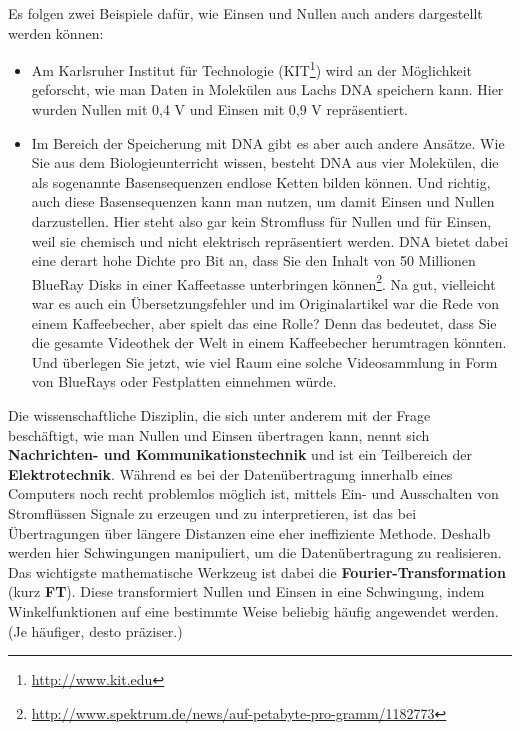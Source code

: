 Es folgen zwei Beispiele dafür, wie Einsen und Nullen auch anders dargestellt werden können:
\begin{itemize}
	\item Am Karlsruher Institut für Technologie (KIT\footnote{\url{http://www.kit.edu}}) wird an der Möglichkeit geforscht, wie man Daten in Molekülen aus Lachs DNA speichern kann. Hier wurden Nullen mit 0,4 V und Einsen mit 0,9 V repräsentiert.
	
	\item Im Bereich der Speicherung mit DNA gibt es aber auch andere Ansätze. Wie Sie aus dem Biologieunterricht wissen, besteht DNA aus vier Molekülen, die als sogenannte Basensequenzen endlose Ketten bilden können. Und richtig, auch diese Basensequenzen kann man nutzen, um damit Einsen und Nullen darzustellen. Hier steht also gar kein Stromfluss für Nullen und für Einsen, weil sie chemisch und nicht elektrisch repräsentiert werden. DNA bietet dabei eine derart hohe Dichte pro Bit an, dass Sie den Inhalt von 50 Millionen BlueRay Disks in einer Kaffeetasse unterbringen können\footnote{\url{http://www.spektrum.de/news/auf-petabyte-pro-gramm/1182773}}. Na gut, vielleicht war es auch ein Übersetzungsfehler und im Originalartikel war die Rede von einem Kaffeebecher, aber spielt das eine Rolle? Denn das bedeutet, dass Sie die gesamte Videothek der Welt in einem Kaffeebecher herumtragen könnten. Und überlegen Sie jetzt, wie viel Raum eine solche Videosammlung in Form von BlueRays oder Festplatten einnehmen würde.
\end{itemize}

Die wissenschaftliche Disziplin, die sich unter anderem mit der Frage \\beschäftigt, wie man Nullen und Einsen übertragen kann, nennt sich\\ \textbf{Nachrichten- und Kommunikationstechnik} und ist ein Teilbereich der\\ \textbf{Elektrotechnik}. Während es bei der Datenübertragung innerhalb eines \\ Computers noch recht problemlos möglich ist, mittels Ein- und Ausschalten von Stromflüssen Signale zu erzeugen und zu interpretieren, ist das bei Übertragungen über längere Distanzen eine eher ineffiziente Methode. Deshalb werden hier Schwingungen manipuliert, um die Datenübertragung zu realisieren. Das wichtigste mathematische Werkzeug ist dabei die \textbf{Fourier-Transformation} (kurz \textbf{FT}). Diese transformiert Nullen und Einsen in eine Schwingung, indem Winkelfunktionen auf eine bestimmte Weise beliebig häufig angewendet werden. (Je häufiger, desto präziser.)\\

